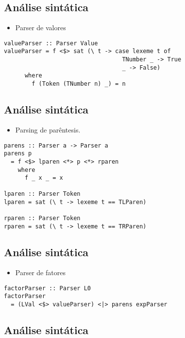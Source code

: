 \documentclass[11pt]{article}
\begin{document}
\subsection*{Análise sintática}
\label{sec:org933aa05}

\begin{itemize}
\item Parser de valores
\end{itemize}

\begin{verbatim}
valueParser :: Parser Value
valueParser = f <$> sat (\ t -> case lexeme t of 
                                  TNumber _ -> True 
                                  _ -> False)
      where 
        f (Token (TNumber n) _) = n 
\end{verbatim}
\subsection*{Análise sintática}
\label{sec:org60659d3}

\begin{itemize}
\item Parsing de parêntesis.
\end{itemize}

\begin{verbatim}
parens :: Parser a -> Parser a 
parens p 
  = f <$> lparen <*> p <*> rparen 
    where 
      f _ x _ = x 

lparen :: Parser Token 
lparen = sat (\ t -> lexeme t == TLParen)

rparen :: Parser Token 
rparen = sat (\ t -> lexeme t == TRParen)
\end{verbatim}
\subsection*{Análise sintática}
\label{sec:org087b57c}

\begin{itemize}
\item Parser de fatores
\end{itemize}

\begin{verbatim}
factorParser :: Parser L0
factorParser 
  = (LVal <$> valueParser) <|> parens expParser 
\end{verbatim}
\subsection*{Análise sintática}
\label{sec:org5cf0743}
\end{document}
